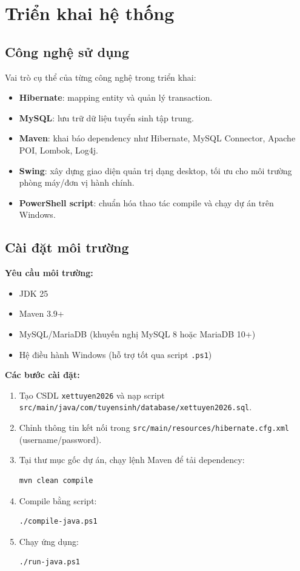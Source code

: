 \documentclass[12pt,a4paper,oneside]{report}
\begin{document}
\chapter{Triển khai hệ thống}
\section{Công nghệ sử dụng}
Vai trò cụ thể của từng công nghệ trong triển khai:
\begin{itemize}
  \item \textbf{Hibernate}: mapping entity và quản lý transaction.
  \item \textbf{MySQL}: lưu trữ dữ liệu tuyển sinh tập trung.
  \item \textbf{Maven}: khai báo dependency như Hibernate, MySQL Connector, Apache POI, Lombok, Log4j.
  \item \textbf{Swing}: xây dựng giao diện quản trị dạng desktop, tối ưu cho môi trường phòng máy/đơn vị hành chính.
  \item \textbf{PowerShell script}: chuẩn hóa thao tác compile và chạy dự án trên Windows.
\end{itemize}

\section{Cài đặt môi trường}
\textbf{Yêu cầu môi trường:}
\begin{itemize}
  \item JDK 25
  \item Maven 3.9+
  \item MySQL/MariaDB (khuyến nghị MySQL 8 hoặc MariaDB 10+)
  \item Hệ điều hành Windows (hỗ trợ tốt qua script \texttt{.ps1})
\end{itemize}

\textbf{Các bước cài đặt:}
\begin{enumerate}
  \item Tạo CSDL \texttt{xettuyen2026} và nạp script \texttt{src/main/java/com/tuyensinh/database/xettuyen2026.sql}.
  \item Chỉnh thông tin kết nối trong \texttt{src/main/resources/hibernate.cfg.xml} (username/password).
  \item Tại thư mục gốc dự án, chạy lệnh Maven để tải dependency:
  \begin{verbatim}
mvn clean compile
  \end{verbatim}
  \item Compile bằng script:
  \begin{verbatim}
./compile-java.ps1
  \end{verbatim}
  \item Chạy ứng dụng:
  \begin{verbatim}
./run-java.ps1
  \end{verbatim}
\end{enumerate}
\end{document}
